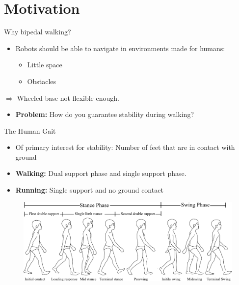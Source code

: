 \section{Motivation}\label{motivation}

\begin{frame}{Why bipedal walking?}

\begin{itemize}
\itemsep1pt\parskip0pt
\item
  Robots should be able to navigate in environments made for humans:

  \begin{itemize}
  \itemsep1pt\parskip0pt
  \item
    Little space
  \item
    Obstacles
  \end{itemize}
\end{itemize}

\(\Rightarrow\) Wheeled base not flexible enough.

\begin{itemize}
\itemsep1pt\parskip0pt
\item
  \textbf{Problem:} How do you guarantee stability during walking?
\end{itemize}

\end{frame}

\begin{frame}{The Human Gait}

\begin{itemize}
\itemsep1pt\parskip0pt
\item
  Of primary interest for stability: Number of feet that are in contact
  with ground
\item
  \textbf{Walking:} Dual support phase and single support phase.
\item
  \textbf{Running:} Single support and no ground contact
\end{itemize}

\begin{figure}[b]
\includegraphics[width=\textwidth,resolution=300]{images/human_gait.png}
\end{figure}

\end{frame}

